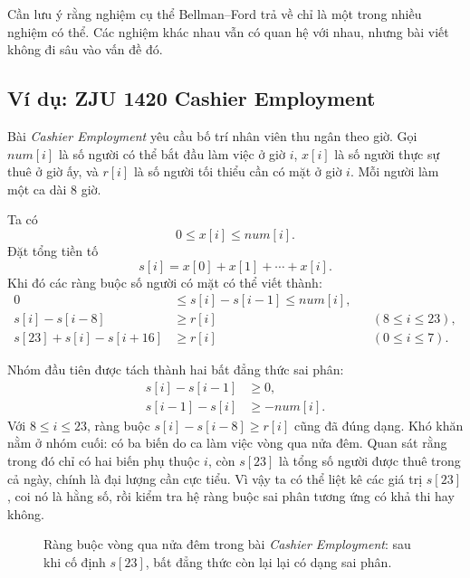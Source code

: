 \documentclass[11pt]{article}
\begin{document}
Cần lưu ý rằng nghiệm cụ thể Bellman--Ford trả về chỉ là một trong nhiều
nghiệm có thể. Các nghiệm khác nhau vẫn có quan hệ với nhau, nhưng bài viết
không đi sâu vào vấn đề đó.

\subsection{Ví dụ: ZJU 1420 Cashier Employment}

Bài \textit{Cashier Employment} yêu cầu bố trí nhân viên thu ngân theo giờ.
Gọi \(num[i]\) là số người có thể bắt đầu làm việc ở giờ \(i\), \(x[i]\) là
số người thực sự thuê ở giờ ấy, và \(r[i]\) là số người tối thiểu cần có mặt ở
giờ \(i\). Mỗi người làm một ca dài \(8\) giờ.

Ta có
\[
  0\le x[i]\le num[i].
\]
Đặt tổng tiền tố
\[
  s[i]=x[0]+x[1]+\cdots+x[i].
\]
Khi đó các ràng buộc số người có mặt có thể viết thành:
\[
\begin{aligned}
  0&\le s[i]-s[i-1]\le num[i],\\
  s[i]-s[i-8]&\ge r[i] &&(8\le i\le 23),\\
  s[23]+s[i]-s[i+16]&\ge r[i] &&(0\le i\le 7).
\end{aligned}
\]

Nhóm đầu tiên được tách thành hai bất đẳng thức sai phân:
\[
\begin{aligned}
  s[i]-s[i-1]&\ge 0,\\
  s[i-1]-s[i]&\ge -num[i].
\end{aligned}
\]
Với \(8\le i\le 23\), ràng buộc \(s[i]-s[i-8]\ge r[i]\) cũng đã đúng dạng.
Khó khăn nằm ở nhóm cuối: có ba biến do ca làm việc vòng qua nửa đêm. Quan sát
rằng trong đó chỉ có hai biến phụ thuộc \(i\), còn \(s[23]\) là tổng số người
được thuê trong cả ngày, chính là đại lượng cần cực tiểu. Vì vậy ta có thể
liệt kê các giá trị \(s[23]\), coi nó là hằng số, rồi kiểm tra hệ ràng buộc sai phân
tương ứng có khả thi hay không.

\begin{figure}[ht]
\centering
{}
\caption{Ràng buộc vòng qua nửa đêm trong bài \textit{Cashier Employment}:
sau khi cố định \(s[23]\), bất đẳng thức còn lại lại có dạng sai phân.}
\end{figure}
\end{document}
